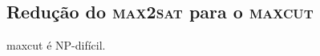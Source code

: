 		

	\bigskip
	\bigskip

	\subsection{Redução do \textbf{\textsc {max2sat}} para o \textbf{\textsc {maxcut}}}

		\begin{teo}
			{\sc maxcut} é NP-difícil.
		\end{teo}
